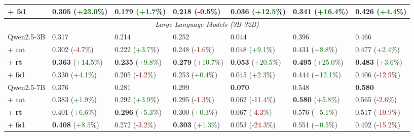 \documentclass[11pt]{article}
\begin{document}
\begin{table}[t]
\begin{tabular}{lllllll}
\hspace{1em} + {\textbf{fs1}} & 0.305 (\textcolor{darkgreen}{+23.0}\%) & 0.179 (\textcolor{darkgreen}{+1.7}\%) & 0.218 (\textcolor{darkred}{-0.5}\%) & 0.036 (\textcolor{darkgreen}{+12.5}\%) & 0.341 (\textcolor{darkgreen}{+16.4}\%) & 0.426 (\textcolor{darkgreen}{+4.4}\%) \\
\midrule
\multicolumn{7}{c}{\emph{Large Language Models (3B-32B)}} \\
\midrule
Qwen2.5-3B & 0.317 & 0.214 & 0.252 & 0.044 & 0.396 & 0.466 \\
\hspace{1em} + {cot} & 0.302 (\textcolor{darkred}{-4.7}\%) & 0.222 (\textcolor{darkgreen}{+3.7}\%) & 0.248 (\textcolor{darkred}{-1.6}\%) & 0.048 (\textcolor{darkgreen}{+9.1}\%) & 0.431 (\textcolor{darkgreen}{+8.8}\%) & 0.477 (\textcolor{darkgreen}{+2.4}\%) \\
\hspace{1em} + {\textbf{rt}} & \textbf{0.363} (\textcolor{darkgreen}{+14.5}\%) & \textbf{0.235} (\textcolor{darkgreen}{+9.8}\%) & \textbf{0.279} (\textcolor{darkgreen}{+10.7}\%) & \textbf{0.053} (\textcolor{darkgreen}{+20.5}\%) & \textbf{0.495} (\textcolor{darkgreen}{+25.0}\%) & \textbf{0.483} (\textcolor{darkgreen}{+3.6}\%) \\
\hspace{1em} + {\textbf{fs1}} & 0.330 (\textcolor{darkgreen}{+4.1}\%) & 0.205 (\textcolor{darkred}{-4.2}\%) & 0.253 (\textcolor{darkgreen}{+0.4}\%) & 0.045 (\textcolor{darkgreen}{+2.3}\%) & 0.444 (\textcolor{darkgreen}{+12.1}\%) & 0.406 (\textcolor{darkred}{-12.9}\%) \\
\midrule
Qwen2.5-7B & 0.376 & 0.281 & 0.299 & \textbf{0.070} & 0.548 & \textbf{0.580} \\
\hspace{1em} + {cot} & 0.383 (\textcolor{darkgreen}{+1.9}\%) & 0.292 (\textcolor{darkgreen}{+3.9}\%) & 0.295 (\textcolor{darkred}{-1.3}\%) & 0.062 (\textcolor{darkred}{-11.4}\%) & \textbf{0.580} (\textcolor{darkgreen}{+5.8}\%) & 0.565 (\textcolor{darkred}{-2.6}\%) \\
\hspace{1em} + {\textbf{rt}} & 0.401 (\textcolor{darkgreen}{+6.6}\%) & \textbf{0.296} (\textcolor{darkgreen}{+5.3}\%) & 0.300 (\textcolor{darkgreen}{+0.3}\%) & 0.067 (\textcolor{darkred}{-4.3}\%) & 0.576 (\textcolor{darkgreen}{+5.1}\%) & 0.517 (\textcolor{darkred}{-10.9}\%) \\
\hspace{1em} + {\textbf{fs1}} & \textbf{0.408} (\textcolor{darkgreen}{+8.5}\%) & 0.272 (\textcolor{darkred}{-3.2}\%) & \textbf{0.303} (\textcolor{darkgreen}{+1.3}\%) & 0.053 (\textcolor{darkred}{-24.3}\%) & 0.551 (\textcolor{darkgreen}{+0.5}\%) & 0.492 (\textcolor{darkred}{-15.2}\%) \\

\end{tabular}
\end{table}
\end{document}
